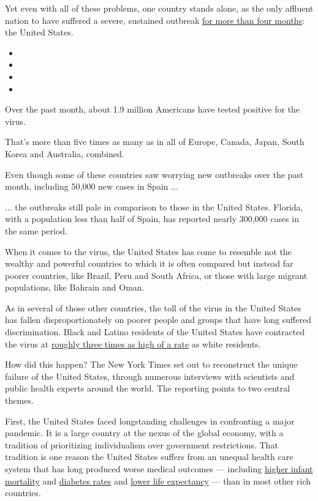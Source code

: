 Yet even with all of these problems, one country stands alone, as the
only affluent nation to have suffered a severe, sustained outbreak
\href{https://www.nytimes.com/interactive/2020/us/coronavirus-us-cases.html}{for
more than four months}: the United States.

\begin{itemize}
\item
\item
\item
\item
\end{itemize}

Over the past month, about 1.9 million Americans have tested positive
for the virus.

That's more than five times as many as in all of Europe, Canada, Japan,
South Korea and Australia, combined.

Even though some of these countries saw worrying new outbreaks over the
past month, including 50,000 new cases in Spain ...

... the outbreaks still pale in comparison to those in the United
States. Florida, with a population less than half of Spain, has reported
nearly 300,000 cases in the same period.

When it comes to the virus, the United States has come to resemble not
the wealthy and powerful countries to which it is often compared but
instead far poorer countries, like Brazil, Peru and South Africa, or
those with large migrant populations, like Bahrain and Oman.

As in several of those other countries, the toll of the virus in the
United States has fallen disproportionately on poorer people and groups
that have long suffered discrimination. Black and Latino residents of
the United States have contracted the virus at
\href{https://www.nytimes.com/interactive/2020/07/05/us/coronavirus-latinos-african-americans-cdc-data.html}{roughly
three times as high of a rate} as white residents.

How did this happen? The New York Times set out to reconstruct the
unique failure of the United States, through numerous interviews with
scientists and public health experts around the world. The reporting
points to two central themes.

First, the United States faced longstanding challenges in confronting a
major pandemic. It is a large country at the nexus of the global
economy, with a tradition of prioritizing individualism over government
restrictions. That tradition is one reason the United States suffers
from an unequal health care system that has long produced worse medical
outcomes --- including
\href{https://www.cia.gov/library/publications/the-world-factbook/rankorder/2091rank.html}{higher
infant mortality} and
\href{https://data.worldbank.org/indicator/SH.STA.DIAB.ZS}{diabetes
rates} and
\href{https://data.worldbank.org/indicator/SP.DYN.LE00.IN}{lower life
expectancy} --- than in most other rich countries.

